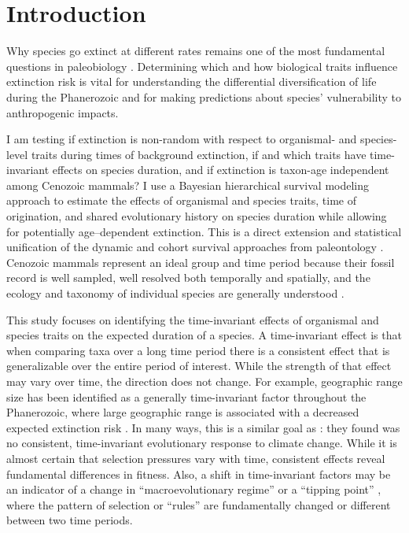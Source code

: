 \documentclass[12pt,letterpaper]{article}
\begin{document}
\section{Introduction}

Why species go extinct at different rates remains one of the most fundamental questions in paleobiology \citep{Simpson1944,VanValen1973,Raup1991b,Raup1994,Quental2013,Wagner2014b,Jablonski2005,Payne2007,Kitchell1986}. Determining which and how biological traits influence extinction risk is vital for understanding the differential diversification of life during the Phanerozoic and for making predictions about species' vulnerability to anthropogenic impacts. 

I am testing if extinction is non-random with respect to organismal- and species-level traits during times of background extinction, if and which traits have time-invariant effects on species duration, and if extinction is taxon-age independent among Cenozoic mammals? I use a Bayesian hierarchical survival modeling approach to estimate the effects of organismal and species traits, time of origination, and shared evolutionary history on species duration while allowing for potentially age--dependent extinction. This is a direct extension and statistical unification of the dynamic and cohort survival approaches from paleontology \citep{Simpson1944,VanValen1973,Foote1988,Raup1978,Raup1975,VanValen1979,Baumiller1993,Sepkoski1975}. Cenozoic mammals represent an ideal group and time period because their fossil record is well sampled, well resolved both temporally and spatially, and the ecology and taxonomy of individual species are generally understood \citep{Alroy2009,Alroy2000g,Jernvall2002,Liow2008,Smith2004,Quental2013,Alroy1996a,Alroy1998,Simpson1944,Blois2009,Tomiya2013,Marcot2014}. 

This study focuses on identifying the time-invariant effects of organismal and species traits on the expected duration of a species. A time-invariant effect is that when comparing taxa over a long time period there is a consistent effect that is generalizable over the entire period of interest. While the strength of that effect may vary over time, the direction does not change. For example, geographic range size has been identified as a generally time-invariant factor throughout the Phanerozoic, where large geographic range is associated with a decreased expected extinction risk \citep{Payne2007}. In many ways, this is a similar goal as \citet{Alroy2000g}: they found was no consistent, time-invariant evolutionary response to climate change. While it is almost certain that selection pressures vary with time, consistent effects reveal fundamental differences in fitness. Also, a shift in time-invariant factors may be an indicator of a change in ``macroevolutionary regime'' \citep{Jablonski1986} or a ``tipping point'' \citep{Barnosky2012a,Barnosky2011}, where the pattern of selection or ``rules'' are fundamentally changed or different between two time periods.
\end{document}
